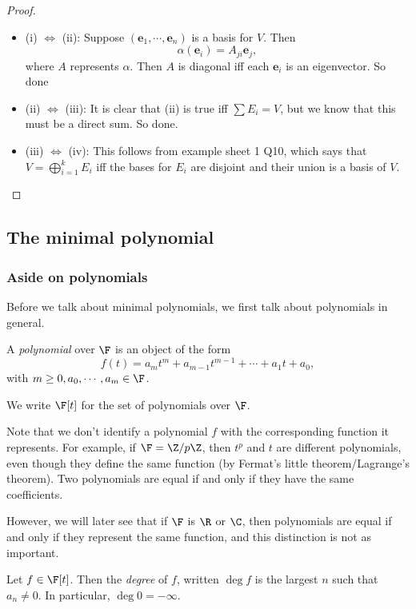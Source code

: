 \documentclass[a4paper]{article}
\begin{document}
\begin{proof}\leavevmode
  \begin{itemize}
    \item (i) $\Leftrightarrow$ (ii): Suppose $(\mathbf{e}_1, \cdots, \mathbf{e}_n)$ is a basis for $V$. Then
      \[
        \alpha(\mathbf{e}_i) = A_{ji} \mathbf{e}_j,
      \]
      where $A$ represents $\alpha$. Then $A$ is diagonal iff each $\mathbf{e}_i$ is an eigenvector. So done
    \item (ii) $\Leftrightarrow$ (iii): It is clear that (ii) is true iff $\sum E_i = V$, but we know that this must be a direct sum. So done.
    \item (iii) $\Leftrightarrow$ (iv): This follows from example sheet 1 Q10, which says that $V = \bigoplus_{i = 1}^k E_i$ iff the bases for $E_i$ are disjoint and their union is a basis of $V$.
  \end{itemize}
\end{proof}
\subsection{The minimal polynomial}
\subsubsection{Aside on polynomials}
Before we talk about minimal polynomials, we first talk about polynomials in general.

\begin{defi}[Polynomial]
  A \emph{polynomial} over $\F$ is an object of the form
  \[
    f(t) = a_m t^m + a_{m - 1}t^{m - 1} + \cdots + a_1 t + a_0,
  \]
  with $m \geq 0, a_0, \cdots, a_m \in \F$.

  We write $\F[t]$ for the set of polynomials over $\F$.
\end{defi}
Note that we don't identify a polynomial $f$ with the corresponding function it represents. For example, if $\F = \Z/p\Z$, then $t^p$ and $t$ are different polynomials, even though they define the same function (by Fermat's little theorem/Lagrange's theorem). Two polynomials are equal if and only if they have the same coefficients.

However, we will later see that if $\F$ is $\R$ or $\C$, then polynomials are equal if and only if they represent the same function, and this distinction is not as important.

\begin{defi}[Degree]
  Let $f \in \F[t]$. Then the \emph{degree} of $f$, written $\deg f$ is the largest $n$ such that $a_n \not= 0$. In particular, $\deg 0 = -\infty$.
\end{defi}
\end{document}
